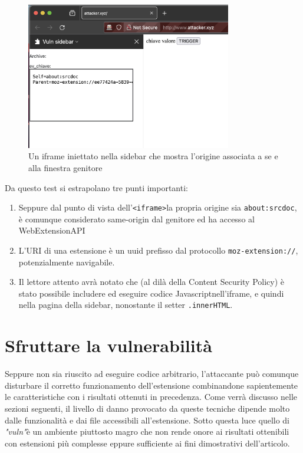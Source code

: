 \documentclass{sapthesis}
\newcommand{\code}[1]{\texttt{#1}}
\newcommand{\attr}[1]{\code{.#1}}
\newcommand{\vuln}{\textit{"vuln"}}
\newcommand{\JS}{Javascript}
\newcommand{\tagHTML}[1]{\code{<#1>}}
\newcommand{\iframe}{\tagHTML{iframe}}
\begin{document}
            \begin{figure}[ht]
                \centering
                \includegraphics[width=0.8\textwidth]{sidebar-iframe-test.png}
                \caption{Un iframe iniettato nella sidebar che mostra l'origine associata a se e alla finestra genitore}
                \label{fig:sidebar-iframe-example}
            \end{figure}

            Da questo test si estrapolano tre punti importanti:
            \begin{enumerate}
                \item Seppure dal punto di vista dell'\iframe la propria origine sia \code{about:srcdoc}, è comunque
                        considerato same-origin dal genitore ed ha accesso al WebExtensionAPI

                \item L'URI di una estensione è un uuid prefisso dal protocollo \code{moz-extension://}, potenzialmente
                        navigabile.

                \item Il lettore attento avrà notato che (al dilà della Content Security Policy) è stato possibile
                        includere ed eseguire codice \JS nell'iframe, e quindi nella pagina della sidebar, nonostante 
                        il setter \attr{innerHTML}.
            \end{enumerate}
            
    
    \section{Sfruttare la vulnerabilità}
    \label{sec:attaccando-vuln-risultati}
        Seppure non sia riuscito ad eseguire codice arbitrario, l'attaccante può comunque disturbare il corretto
        funzionamento dell'estensione combinandone sapientemente le caratteristiche con i risultati
        ottenuti in precedenza. Come verrà discusso nelle sezioni seguenti, il livello di danno provocato da queste 
        tecniche dipende molto dalle funzionalità e dai file accessibili all'estensione. Sotto questa luce 
        quello di \vuln è un ambiente piuttosto magro che non rende onore ai risultati ottenibili con estensioni più 
        complesse eppure sufficiente ai fini dimostrativi dell'articolo.
\end{document}
